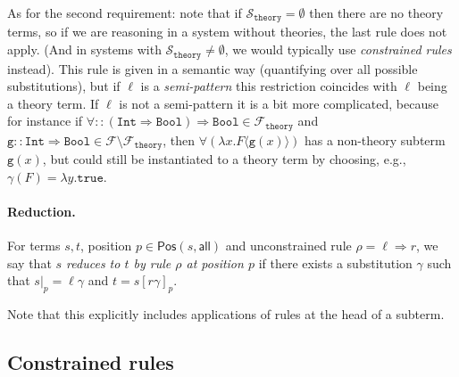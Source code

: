 \documentclass{lmcs}
\theoremstyle{theorem}\newtheorem{theorem}{Theorem}
\theoremstyle{theorem}\newtheorem{lemma}[theorem]{Lemma}
\theoremstyle{theorem}\newtheorem{corollary}[theorem]{Corollary}
\theoremstyle{definition}\newtheorem{definition}[theorem]{Definition}
\theoremstyle{definition}\newtheorem{example}[theorem]{Example}
\newcommand{\F}{\mathcal{F}}
\newcommand{\thF}{\mathcal{F}_{\mathtt{theory}}}
\newcommand{\M}{\mathcal{M}}
\newcommand{\Vfree}{\mathcal{V}_{\mathit{nonb}}}
\newcommand{\thSorts}{\mathcal{S}_{\mathtt{theory}}}
\newcommand{\Positions}{\mathsf{Pos}}
\newcommand{\identifier}[1]{\mathtt{#1}}
\newcommand{\afun}{\identifier{f}}
\newcommand{\bfun}{\identifier{g}}
\newcommand{\avar}{x}
\newcommand{\bvar}{y}
\newcommand{\AFvar}{F}
\newcommand{\abs}[2]{\lambda #1.#2}
\newcommand{\meta}[2]{#1\langle#2\rangle}
\newcommand{\arrtype}{\Rightarrow}
\newcommand{\arrz}{\Rightarrow}
\newcommand{\symb}[1]{\mathtt{#1}}
\newcommand{\strue}{\symb{true}}
\newcommand{\bool}{\symb{Bool}}
\newcommand{\tint}{\symb{Int}}
\newcommand{\myparagraph}[1]{\paragraph{\textbf{#1.}}}
\begin{document}
%

As for the second requirement: note that if $\thSorts = \emptyset$ then there
are no theory terms, so if we are reasoning in a system without theories, the
last rule does not apply. (And in systems with $\thSorts \neq \emptyset$, we
would typically use \emph{constrained rules} instead).
This rule is given in a semantic way (quantifying over all possible
substitutions), but if $\ell$ is a \emph{semi-pattern} this restriction
coincides with $\ell$ being a theory term.  If $\ell$ is not a semi-pattern it
is a bit more complicated, because for instance if $\forall :: (\tint \arrtype
\bool) \arrtype \bool \in \thF$ and $\bfun :: \tint \arrtype \bool \in \F
\setminus \thF$, then $\forall(\abs{\avar}{\meta{\AFvar}{\bfun(\avar)}})$ has a
non-theory subterm $\bfun(\avar)$, but could still be instantiated to a theory
term by choosing, e.g., $\gamma(\AFvar) = \abs{\bvar}{\strue}$.

\myparagraph{Reduction}
For terms $s,t$, position $p \in \Positions(s,\mathsf{all})$ and unconstrained
rule $\rho = \ell \arrz r$, we say that \emph{$s$ reduces to $t$ by rule $\rho$
at position $p$} if there exists a substitution $\gamma$ such that $s|_p =
\ell\gamma$ and $t = s[r\gamma]_p$.

Note that this explicitly includes applications of rules at the head of a
subterm.

\subsection{Constrained rules}
\end{document}
